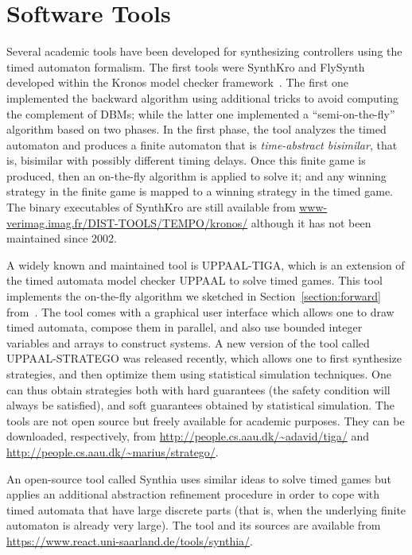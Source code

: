 \documentclass{article}
\begin{document}
\section{Software Tools}
Several academic tools have been developed for synthesizing controllers using the timed
automaton formalism.
The first tools were SynthKro and FlySynth developed within the Kronos model
checker framework~\cite{altisen2002tools}. The first one implemented the
backward algorithm using additional tricks to avoid computing the complement of
DBMs; while the latter one implemented a ``semi-on-the-fly'' algorithm based on
two phases. In the first phase, the tool analyzes the timed automaton and
produces a finite automaton that is \emph{time-abstract bisimilar}, that is,
bisimilar with possibly different timing delays. Once this finite game is
produced, then an on-the-fly algorithm is applied to solve it; and any winning
strategy in the finite game is mapped to a winning strategy in the timed game.
The binary executables of SynthKro are still available from
\url{www-verimag.imag.fr/DIST-TOOLS/TEMPO/kronos/} although it has not been
maintained since 2002.

A widely known and maintained tool is UPPAAL-TIGA, which is an extension of the timed automata
model checker UPPAAL to solve timed games. This tool implements the on-the-fly algorithm
we sketched in Section~\cref{section:forward} from~\cite{Cassez05}. The tool comes with a graphical
user interface which allows one to draw timed automata, compose them in
parallel, and also use bounded integer variables and arrays to construct
systems. A new version of the tool called UPPAAL-STRATEGO was released recently,
which allows one to first synthesize strategies, and then optimize them using
statistical simulation techniques. One can thus obtain strategies both with hard
guarantees (the safety condition will always be satisfied), and soft guarantees
obtained by statistical simulation.
The tools are not open source but freely available for academic purposes. They
can be downloaded, respectively, from
\url{http://people.cs.aau.dk/~adavid/tiga/}
and \url{http://people.cs.aau.dk/~marius/stratego/}.

An open-source tool called Synthia uses similar ideas to solve timed games but applies
an additional abstraction refinement procedure in order to cope with timed
automata that have large discrete parts (that is, when the underlying finite
automaton is already very large). The tool and its sources are available from
\url{https://www.react.uni-saarland.de/tools/synthia/}.
\end{document}
